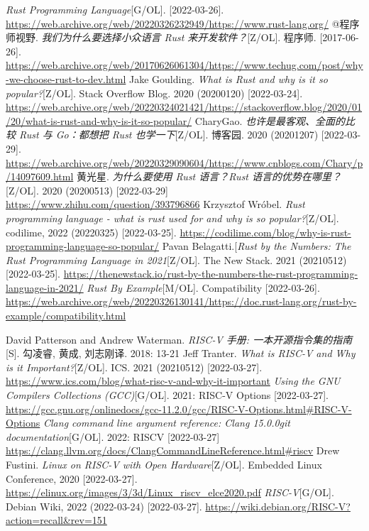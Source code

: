 \documentclass{../runikraft-report}
\begin{document}
\begin{thebibliography}{99}
 \textit{Rust Programming Language}[G/OL]. [2022-03-26]. \url{https://web.archive.org/web/20220326232949/https://www.rust-lang.org/}
 @程序师视野. \textit{我们为什么要选择小众语言 Rust 来开发软件？}[Z/OL]. 程序师. [2017-06-26]. \url{https://web.archive.org/web/20170626061304/https://www.techug.com/post/why-we-choose-rust-to-dev.html}
Jake Goulding. \textit{What is Rust and why is it so popular?}[Z/OL]. Stack Overflow Blog. 2020 (20200120) [2022-03-24]. \url{https://web.archive.org/web/20220324021421/https://stackoverflow.blog/2020/01/20/what-is-rust-and-why-is-it-so-popular/}
 CharyGao. \textit{也许是最客观、全面的比较 Rust 与 Go：都想把 Rust 也学一下}[Z/OL]. 博客园. 2020 (20201207) [2022-03-29]. \url{https://web.archive.org/web/20220329090604/https://www.cnblogs.com/Chary/p/14097609.html}
 黄光星. \textit{为什么要使用 Rust 语言？Rust 语言的优势在哪里？}[Z/OL].
2020 (20200513) [2022-03-29] \url{https://www.zhihu.com/question/393796866}
 Krzysztof Wróbel. \textit{Rust programming language - what is rust used for and why is so popular?}[Z/OL]. codilime, 2022 (20220325) [2022-03-25]. \url{https://codilime.com/blog/why-is-rust-programming-language-so-popular/}
 Pavan Belagatti.[\textit{Rust by the Numbers: The Rust Programming Language in 2021}[Z/OL]. The New Stack. 2021 (20210512) [2022-03-25]. \url{https://thenewstack.io/rust-by-the-numbers-the-rust-programming-language-in-2021/}
 \textit{Rust By Example}[M/OL]. Compatibility [2022-03-26]. \url{https://web.archive.org/web/20220326130141/https://doc.rust-lang.org/rust-by-example/compatibility.html}

 David Patterson and Andrew Waterman. \textit{RISC-V 手册: 一本开源指令集的指南}[S]. 勾凌睿, 黄成, 刘志刚译. 2018: 13-21
 Jeff Tranter. \textit{What is RISC-V and Why is it Important?}[Z/OL]. ICS. 2021 (20210512) [2022-03-27]. \url{https://www.ics.com/blog/what-risc-v-and-why-it-important}
 \textit{Using the GNU Compilers Collections (GCC)}[G/OL]. 2021: RISC-V Options [2022-03-27]. \url{https://gcc.gnu.org/onlinedocs/gcc-11.2.0/gcc/RISC-V-Options.html#RISC-V-Options}
 \textit{Clang command line argument reference: Clang 15.0.0git documentation}[G/OL]. 2022: RISCV [2022-03-27] \url{https://clang.llvm.org/docs/ClangCommandLineReference.html#riscv}
 Drew Fustini. \textit{Linux on RISC-V
with Open Hardware}[Z/OL]. Embedded Linux Conference, 2020 [2022-03-27]. \url{https://elinux.org/images/3/3d/Linux_riscv_elce2020.pdf}
 \textit{RISC-V}[G/OL]. Debian Wiki, 2022 (2022-03-24) [2022-03-27]. \url{https://wiki.debian.org/RISC-V?action=recall&rev=151}


\end{thebibliography}
\end{document}
